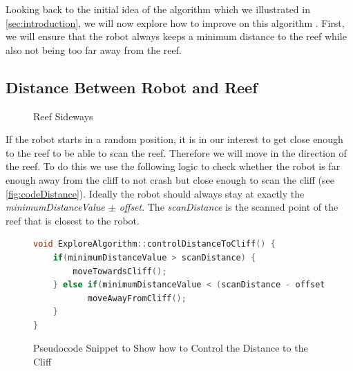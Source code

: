 \documentclass[twoside, 12pt]{article}
\begin{document}
Looking back to the initial idea of the algorithm which we illustrated in \autoref{sec:introduction}, we will now explore how to improve on this algorithm \cite{CoastLineExplorer:npentrel15}. First, we will ensure that the robot always keeps a minimum distance to the reef while also not being too far away from the reef.\\

\subsection{Distance Between Robot and Reef}
\label{sec:distanceBetweenRobotAndReef}
\begin{figure}
\vspace{-28pt}
  \begin{center}
  \end{center}
\vspace{-20pt}
  \caption{Reef Sideways}
  \label{fig:reef}
\vspace{20pt}
\end{figure}

If the robot starts in a random position, it is in our interest to get close enough to the reef to be able to scan the reef. Therefore we will move in the direction of the reef. To do this we use the following logic to check whether the robot is far enough away from the cliff to not crash but close enough to scan the cliff (see \autoref{fig:codeDistance}). Ideally the robot should always stay at exactly the \textit{minimumDistanceValue $\pm$ offset}. The \textit{scanDistance} is the scanned point of the reef that is closest to the robot.\\

\begin{figure}
\vspace{12pt}
\begin{lstlisting}[language=C++]
void ExploreAlgorithm::controlDistanceToCliff() {
    if(minimumDistanceValue > scanDistance) {
        moveTowardsCliff(); 
    } else if(minimumDistanceValue < (scanDistance - offset)) {
    	   moveAwayFromCliff();
    } 
}
\end{lstlisting} 
\vspace{-38pt}
  \caption{Pseudocode Snippet to Show how to Control the Distance to the Cliff}
  \label{fig:codeDistance}
  \vspace{20pt}
\end{figure}
\end{document}
